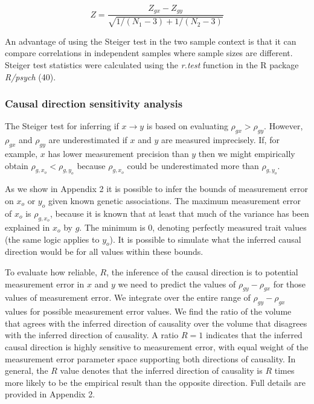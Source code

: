 \documentclass[]{article}
\begin{document}
\[
Z = \frac{Z_{gx} - Z_{gy}} { \sqrt{ 1 / (N_{1} - 3) + 1 / (N_{2} - 3) } }
\]

An advantage of using the Steiger test in the two sample context is that
it can compare correlations in independent samples where sample sizes
are different. Steiger test statistics were calculated using the
\emph{r.test} function in the R package \emph{R/psych} (40).

\subsubsection{Causal direction sensitivity
analysis}\label{causal-direction-sensitivity-analysis}

The Steiger test for inferring if \(x \rightarrow y\) is based on
evaluating \(\rho_{gx} > \rho_{gy}\). However, \(\rho_{gx}\) and
\(\rho_{gy}\) are underestimated if \(x\) and \(y\) are measured
imprecisely. If, for example, \(x\) has lower measurement precision than
\(y\) then we might empirically obtain \(\rho_{g,x_o} < \rho_{g,y_o}\)
because \(\rho_{g,x_o}\) could be underestimated more than
\(\rho_{g,y_o}\).

As we show in Appendix 2 it is possible to infer the bounds of
measurement error on \(x_o\) or \(y_o\) given known genetic
associations. The maximum measurement error of \(x_o\) is
\(\rho_{g,x_o}\), because it is known that at least that much of the
variance has been explained in \(x_o\) by \(g\). The minimum is 0,
denoting perfectly measured trait values (the same logic applies to
\(y_o\)). It is possible to simulate what the inferred causal direction
would be for all values within these bounds.

To evaluate how reliable, \(R\), the inference of the causal direction
is to potential measurement error in \(x\) and \(y\) we need to predict
the values of \(\rho_{gy} - \rho_{gx}\) for those values of measurement
error. We integrate over the entire range of \(\rho_{gy} - \rho_{gx}\)
values for possible measurement error values. We find the ratio of the
volume that agrees with the inferred direction of causality over the
volume that disagrees with the inferred direction of causality. A ratio
\(R=1\) indicates that the inferred causal direction is highly sensitive
to measurement error, with equal weight of the measurement error
parameter space supporting both directions of causality. In general, the
\(R\) value denotes that the inferred direction of causality is \(R\)
times more likely to be the empirical result than the opposite
direction. Full details are provided in Appendix 2.
\end{document}
